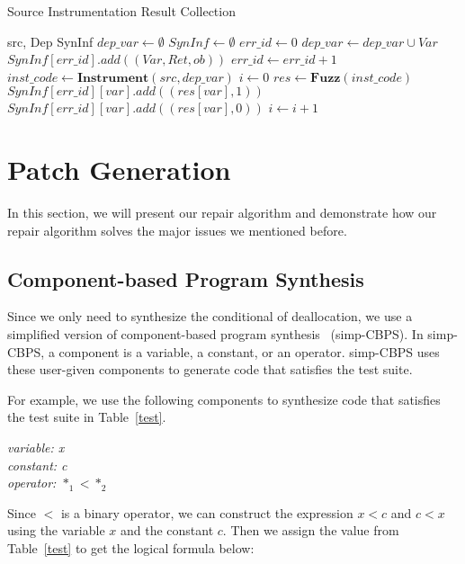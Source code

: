 \documentclass[a4paper,11pt,oneside,openany]{book}
\begin{document}
 \begin{algorithm}[t]
 \caption{Source Instrumentation Result Collection}
 \label{algo1}
 \begin{algorithmic}[1]
 \renewcommand{\algorithmicrequire}{\textbf{Input:}}
 \renewcommand{\algorithmicensure}{\textbf{Output:}}
 \REQUIRE src, Dep
 \ENSURE  SynInf
  \STATE $dep\_var \gets \emptyset$
  \STATE $SynInf \gets \emptyset$
  \STATE $err\_id \gets 0$
   \STATE $dep\_var \gets dep\_var \cup Var$
   \STATE $SynInf[err\_id].add((Var,Ret,ob))$
   \STATE $err\_id \gets err\_id + 1$
  \ENDFOR
  \STATE $inst\_code \gets \textbf{Instrument}(src, dep\_var)$
  \STATE $i \gets 0$
   \STATE $res \gets \textbf{Fuzz}(inst\_code)$
      \STATE $SynInf[err\_id][var].add((res[var],1))$
     \ELSE
      \STATE $SynInf[err\_id][var].add((res[var],0))$
     \ENDIF
     \ENDFOR
    \ENDFOR
   \STATE $i\gets i + 1$
  \ENDWHILE
 \end{algorithmic} 
 \end{algorithm}

\section{Patch Generation}
\label{patchgeneration}

In this section, we will present our repair algorithm and demonstrate how our repair algorithm solves the major issues we mentioned before.


\subsection{Component-based Program Synthesis}
Since we only need to synthesize the conditional of deallocation, we use a simplified version of component-based program synthesis~\cite{oracle} (simp-CBPS). In simp-CBPS, a component is a variable, a constant, or an operator. simp-CBPS uses these user-given components to generate code that satisfies the test suite. 

For example, we use the following components to synthesize code that satisfies the test suite in Table~\ref{test}.


\begin{minipage}{\textwidth}
    \vspace{0.2cm}
    \textsl{\hspace{0.3cm}variable: x\\\hspace{0.3cm}constant: c\\\hspace{0.3cm}operator: $*_1<*_2$\\}
\end{minipage}
Since $<$ is a binary operator, we can construct the expression $x<c$ and $c<x$ using the variable $x$ and the constant $c$. Then we assign the value from Table~\ref{test} to get the logical formula below:
\end{document}
